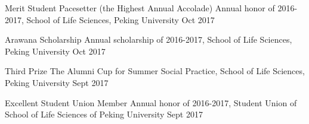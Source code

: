 \begin{cvhonors}

\cvhonor
{Merit Student Pacesetter (the Highest Annual Accolade)} %
{Annual honor of 2016-2017, School of Life Sciences, Peking University} %
{} %
{Oct 2017} %


\cvhonor
{Arawana Scholarship} %
{Annual scholarship of 2016-2017, School of Life Sciences, Peking University} %
{} %
{Oct 2017} %


\cvhonor
{Third Prize} %
{The Alumni Cup for Summer Social Practice, School of Life Sciences, Peking University} %
{} %
{Sept 2017} %

\cvhonor
{Excellent Student Union Member} %
{Annual honor of 2016-2017, Student Union of School of Life Sciences of Peking University} %
{} %
{Sept 2017} %


\end{cvhonors}
